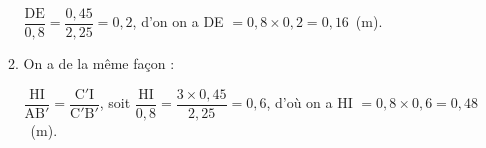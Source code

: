 \begin{enumerate}
\begin{enumerate}
$\dfrac{\text{DE}}{0,8} = \dfrac{0,45}{2,25} = 0,2$, d'on on a DE $ = 0,8 \times 0,2 = 0,16$~(m).
		\item %
On a de la même façon :

$\dfrac{\text{HI}}{\text{AB}'} = \dfrac{\text{C}'\text{I}}{\text{C}'\text{B}'}$, soit $\dfrac{\text{HI}}{0,8} = \dfrac{3 \times 0,45}{2,25} = 0,6$, d'où on a HI $ = 0,8 \times 0,6 = 0,48$~(m).
	\end{enumerate}
	
\end{enumerate}


